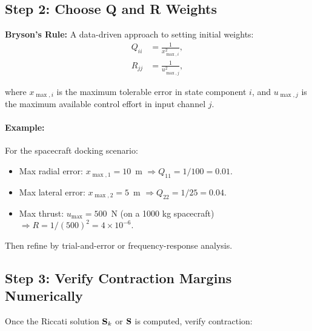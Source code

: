 \subsection{Step 2: Choose Q and R Weights}

\textbf{Bryson's Rule:} A data-driven approach to setting initial weights:
\begin{align}
Q_{ii} &= \frac{1}{x_{{\max},i}^2}, \label{eq:ch8:bryson-Q} \\
R_{jj} &= \frac{1}{u_{{\max},j}^2}, \label{eq:ch8:bryson-R}
\end{align}

where $x_{{\max},i}$ is the maximum tolerable error in state component $i$, and
$u_{{\max},j}$ is the maximum available control effort in input channel $j$.

\paragraph{Example:} For the spacecraft docking scenario:
\begin{itemize}
\item Max radial error: $x_{{\max},1} = 10$~m $\Rightarrow Q_{11} = 1/100 = 0.01$.
\item Max lateral error: $x_{{\max},2} = 5$~m $\Rightarrow Q_{22} = 1/25 = 0.04$.
\item Max thrust: $u_{{\max}} = 500$~N (on a 1000 kg spacecraft) $\Rightarrow R = 1/(500)^2 = 4 \times 10^{-6}$.
\end{itemize}

Then refine by trial-and-error or frequency-response analysis.

\subsection{Step 3: Verify Contraction Margins Numerically}

Once the Riccati solution $\mathbf{S}_k$ or $\mathbf{S}$ is computed, verify contraction:

